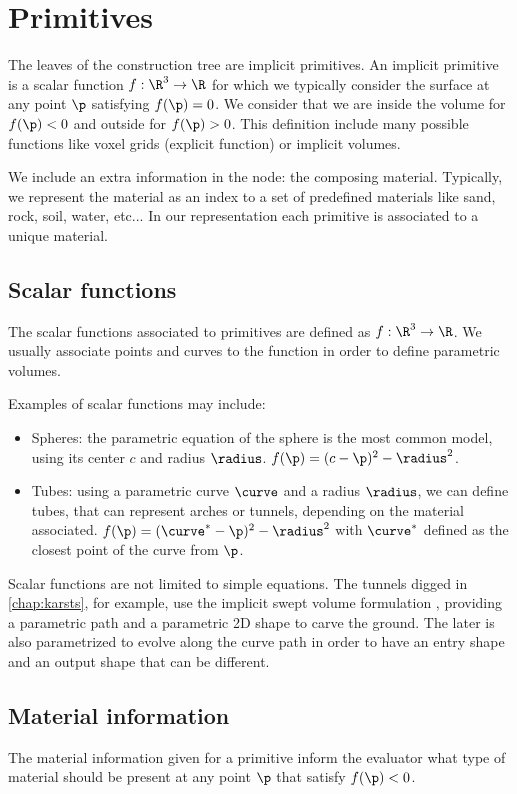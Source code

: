 \section{Primitives}
The leaves of the construction tree are implicit primitives. An implicit primitive is a scalar function $f: \R^3 \to \R$ for which we typically consider the surface at any point $\p$ satisfying $f(\p) = 0$. We consider that we are inside the volume for $f(\p) < 0$ and outside for $f(\p) > 0$. This definition include many possible functions like voxel grids (explicit function) or implicit volumes.

We include an extra information in the node: the composing material. Typically, we represent the material as an index to a set of predefined materials like sand, rock, soil, water, etc... In our representation each primitive is associated to a unique material. 

\subsection{Scalar functions}
The scalar functions associated to primitives are defined as $f: \R^3 \to \R$. We usually associate points and curves to the function in order to define parametric volumes.

Examples of scalar functions may include:
\begin{itemize}
    \item Spheres: the parametric equation of the sphere is the most common model, using its center $c$ and radius $\radius$. $f(\p) = (c - \p)^2 - \radius^2$.
    \item Tubes: using a parametric curve $\curve$ and a radius $\radius$, we can define tubes, that can represent arches or tunnels, depending on the material associated. $f(\p) = (\curve^* - \p)^2 - \radius^2$ with $\curve^*$ defined as the closest point of the curve from $\p$.
\end{itemize}

Scalar functions are not limited to simple equations. The tunnels digged in \cref{chap:karsts}, for example, use the implicit swept volume formulation \cite{Schroeder1994}, providing a parametric path and a parametric 2D shape to carve the ground. The later is also parametrized to evolve along the curve path in order to have an entry shape and an output shape that can be different.

\subsection{Material information}
The material information given for a primitive inform the evaluator what type of material should be present at any point $\p$ that satisfy $f(\p) < 0$.

